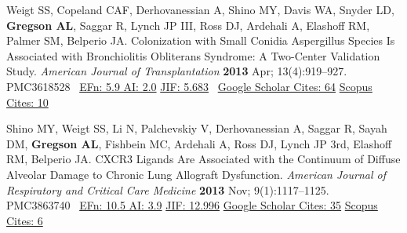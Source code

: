 \documentclass[letterpaper,10pt,sans,dvipsnames,final]{moderncv}%
\begin{document}
\begin{thebibliography}{1}
  \bibitem[22]{} Weigt SS, Copeland CAF, Derhovanessian A, Shino MY, Davis WA, Snyder LD, \textbf{Gregson AL}, Saggar R, Lynch JP III, Ross DJ, Ardehali A, Elashoff RM, Palmer SM, Belperio JA. Colonization with Small Conidia Aspergillus Species Is Associated with Bronchiolitis Obliterans Syndrome: A Two-Center Validation Study. {\color{BrickRed}\textit{American Journal of Transplantation}} \textbf{2013} Apr; 13(4):919--927. \href{http://dx.doi.org/10.1111/ajt.12131}{\aiDoi} {\smaller PMC3618528}~
           {\color{NavyBlue}\href{http://52.6.43.8/projects/journalRank/rankings.php?bsearch=AMERICAN+JOURNAL+OF+TRANSPLANTATION&searchby=journal&orderby=eigenfactor}{{\smaller EFn: 5.9 AI: 2.0}} 
       \href{http://admin-apps.webofknowledge.com/JCR/JCR?RQ=RECORD&rank=1&journal=AM+J+TRANSPLANT}{{\smaller JIF: 5.683}}~
       \href{https://scholar.google.com/scholar?oi=bibs&hl=en&cites=9656768912907863459}{{\smaller Google Scholar Cites: 64}}
       \href{http://www.scopus.com/record/display.url?eid=2-s2.0-84875713808&origin=resultslist&sort=plf-f&src=s&st1=gregson&st2=A&nlo=1&nlr=20&nls=count-f&sid=AFE4F9BA8F397BEA10A9EE5867F44C46.ZmAySxCHIBxxTXbnsoe5w%3a133&sot=anl&sdt=aut&sl=36&s=AU-ID%28%22Gregson%2c+Aric+L.%22+6603096521%29&relpos=1&relpos=1&citeCnt=4&searchTerm=AU-ID%28%5C%26quot%3BGregson%2C+Aric+L.%5C%26quot%3B+6603096521%29}{{\smaller Scopus Cites: 10}}
       }


  \bibitem[23]{} Shino MY, Weigt SS, Li N, Palchevskiy V, Derhovanessian A, Saggar R, Sayah DM, \textbf{Gregson AL}, Fishbein MC, Ardehali A, Ross DJ, Lynch JP 3rd, Elashoff RM, Belperio JA. CXCR3 Ligands Are Associated with the Continuum of Diffuse Alveolar Damage to Chronic Lung Allograft Dysfunction. {\color{BrickRed}\textit{American Journal of Respiratory and Critical Care Medicine}} \textbf{2013} Nov; 9(1):1117--1125. \href{http://dx.doi.org/10.1164/rccm.201305-0861OC}{\aiDoi} {\smaller PMC3863740}~
    {\color{NavyBlue}\href{http://www.eigenfactor.org/rankings.php?bsearch=AMERICAN+JOURNAL+OF+RESPIRATORY+AND+CRITICAL+CARE+MEDICINE&searchby=journal&orderby=eigenfactor}{{\smaller EFn: 10.5 AI: 3.9}}
      \href{http://admin-apps.webofknowledge.com/JCR/JCR?RQ=RECORD&rank=1&journal=AM+J+RESP+CRIT+CARE}{{\smaller JIF: 12.996}}
      \href{https://scholar.google.com/scholar?oi=bibs&hl=en&cites=2055512562952965014}{{\smaller Google Scholar Cites: 35}}
      \href{http://www.scopus.com/record/display.uri?eid=2-s2.0-84887305121&origin=resultslist&sort=plf-f&src=s&st1=gregson%2c+a&nlo=&nlr=&nls=&sid=4E3F003C86CD3B740CA1877B02032D8B.y7ESLndDIsN8cE7qwvy6w%3a1990&sot=b&sdt=cl&cluster=scosubtype%2c%22ar%22%2ct%2bscoauthid%2c%226603096521%22%2ct&sl=23&s=AUTHOR-NAME%28gregson%2c+a%29&relpos=2&citeCnt=6&searchTerm=AUTHOR-NAME%28gregson%2C+a%29+AND+%28+LIMIT-TO%28DOCTYPE%2C%5C%26quot%3Bar%5C%26quot%3B+%29+%29++AND+%28+LIMIT-TO%28AU-ID%2C%5C%26quot%3BGregson%2C+Aric+L.%5C%26quot%3B+6603096521%29+%29+}{{\smaller Scopus Cites: 6}}
    }


\end{thebibliography}
\end{document}
